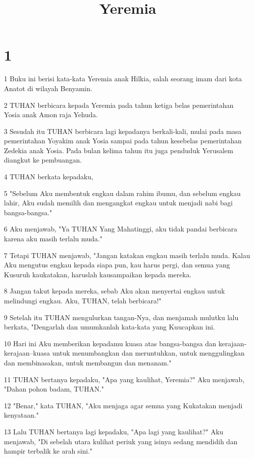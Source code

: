 

\title{Yeremia}


\chapter{1}

\par 1 Buku ini berisi kata-kata Yeremia anak Hilkia, salah seorang imam dari kota Anatot di wilayah Benyamin.
\par 2 TUHAN berbicara kepada Yeremia pada tahun ketiga belas pemerintahan Yosia anak Amon raja Yehuda.
\par 3 Sesudah itu TUHAN berbicara lagi kepadanya berkali-kali, mulai pada masa pemerintahan Yoyakim anak Yosia sampai pada tahun kesebelas pemerintahan Zedekia anak Yosia. Pada bulan kelima tahun itu juga penduduk Yerusalem diangkut ke pembuangan.
\par 4 TUHAN berkata kepadaku,
\par 5 "Sebelum Aku membentuk engkau dalam rahim ibumu, dan sebelum engkau lahir, Aku sudah memilih dan mengangkat engkau untuk menjadi nabi bagi bangsa-bangsa."
\par 6 Aku menjawab, "Ya TUHAN Yang Mahatinggi, aku tidak pandai berbicara karena aku masih terlalu muda."
\par 7 Tetapi TUHAN menjawab, "Jangan katakan engkau masih terlalu muda. Kalau Aku mengutus engkau kepada siapa pun, kau harus pergi, dan semua yang Kusuruh kaukatakan, haruslah kausampaikan kepada mereka.
\par 8 Jangan takut kepada mereka, sebab Aku akan menyertai engkau untuk melindungi engkau. Aku, TUHAN, telah berbicara!"
\par 9 Setelah itu TUHAN mengulurkan tangan-Nya, dan menjamah mulutku lalu berkata, "Dengarlah dan umumkanlah kata-kata yang Kuucapkan ini.
\par 10 Hari ini Aku memberikan kepadamu kuasa atas bangsa-bangsa dan kerajaan-kerajaan--kuasa untuk menumbangkan dan meruntuhkan, untuk menggulingkan dan membinasakan, untuk membangun dan menanam."
\par 11 TUHAN bertanya kepadaku, "Apa yang kaulihat, Yeremia?" Aku menjawab, "Dahan pohon badam, TUHAN."
\par 12 "Benar," kata TUHAN, "Aku menjaga agar semua yang Kukatakan menjadi kenyataan."
\par 13 Lalu TUHAN bertanya lagi kepadaku, "Apa lagi yang kaulihat?" Aku menjawab, "Di sebelah utara kulihat periuk yang isinya sedang mendidih dan hampir terbalik ke arah sini."
